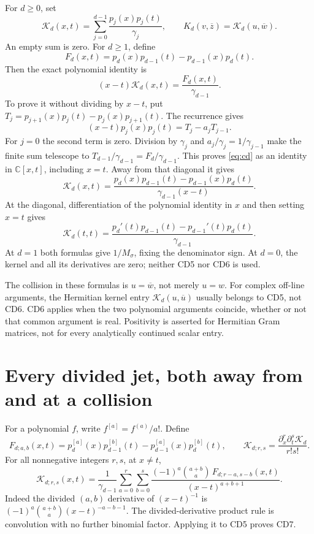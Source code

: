 \documentclass[11pt]{article}
\newcommand{\C}{\mathbb C}
\begin{document}
For \(d\geq0\), set
\[
 \mathcal K_d(x,t)=\sum_{j=0}^{d-1}\frac{p_j(x)p_j(t)}{\gamma_j},
 \qquad K_d(v,\overline z)=\mathcal K_d(u,\overline w).
\]
An empty sum is zero. For \(d\geq1\), define
\[
 F_d(x,t)=p_d(x)p_{d-1}(t)-p_{d-1}(x)p_d(t).
\]
Then the exact polynomial identity is
\begin{equation}\label{eq:cd}
 (x-t)\mathcal K_d(x,t)=\frac{F_d(x,t)}{\gamma_{d-1}}.
 \tag{CD4}
\end{equation}
To prove it without dividing by \(x-t\), put
\(T_j=p_{j+1}(x)p_j(t)-p_j(x)p_{j+1}(t)\).
The recurrence gives
\[
 (x-t)p_j(x)p_j(t)=T_j-a_jT_{j-1}.
\]
For \(j=0\) the second term is zero. Division by \(\gamma_j\) and
\(a_j/\gamma_j=1/\gamma_{j-1}\) make the finite sum telescope to
\(T_{d-1}/\gamma_{d-1}=F_d/\gamma_{d-1}\).
This proves \eqref{eq:cd} as an identity in \(\C[x,t]\), including
\(x=t\). Away from that diagonal it gives
\begin{equation}\label{eq:offdiagonal}
 \boxed{\mathcal K_d(x,t)=
 \frac{p_d(x)p_{d-1}(t)-p_{d-1}(x)p_d(t)}
      {\gamma_{d-1}(x-t)}.}
 \tag{CD5}
\end{equation}
At the diagonal, differentiation of the polynomial identity in \(x\)
and then setting \(x=t\) gives
\begin{equation}\label{eq:diagonal}
 \boxed{\mathcal K_d(t,t)=
 \frac{p_d'(t)p_{d-1}(t)-p_{d-1}'(t)p_d(t)}{\gamma_{d-1}}.}
 \tag{CD6}
\end{equation}
At \(d=1\) both formulas give \(1/M_\sigma\), fixing the denominator
sign. At \(d=0\), the kernel and all its derivatives are zero; neither
CD5 nor CD6 is used.

The collision in these formulas is \(u=\overline w\), not merely
\(u=w\). For complex off-line arguments, the Hermitian kernel entry
\(\mathcal K_d(u,\overline u)\) usually belongs to CD5, not CD6.
CD6 applies when the two polynomial arguments coincide, whether or not
that common argument is real. Positivity is asserted for Hermitian Gram
matrices, not for every analytically continued scalar entry.

\section{Every divided jet, both away from and at a collision}

For a polynomial \(f\), write \(f^{[a]}=f^{(a)}/a!\). Define
\[
 F_{d;a,b}(x,t)=p_d^{[a]}(x)p_{d-1}^{[b]}(t)
             -p_{d-1}^{[a]}(x)p_d^{[b]}(t),
 \qquad
 \mathcal K_{d;r,s}=\frac{\partial_x^r\partial_t^s\mathcal K_d}{r!s!}.
\]
For all nonnegative integers \(r,s\), at \(x\ne t\),
\begin{equation}\label{eq:jets-away}
 \boxed{\mathcal K_{d;r,s}(x,t)=\frac1{\gamma_{d-1}}
  \sum_{a=0}^r\sum_{b=0}^s
  \frac{(-1)^a\binom{a+b}{a}\,
        F_{d;r-a,s-b}(x,t)}{(x-t)^{a+b+1}}.}
 \tag{CD7}
\end{equation}
Indeed the divided \((a,b)\) derivative of \((x-t)^{-1}\) is
\((-1)^a\binom{a+b}{a}(x-t)^{-a-b-1}\). The divided-derivative product
rule is convolution with no further binomial factor. Applying it to
CD5 proves CD7.
\end{document}
